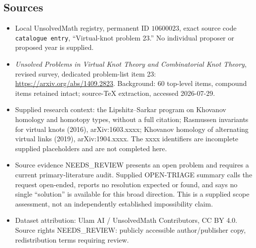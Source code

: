\documentclass[11pt]{article}
\begin{document}
\subsection{Sources}
\begin{itemize}
\item Local UnsolvedMath registry, permanent ID \(10600023\), exact source code \texttt{catalogue entry}, ``Virtual-knot problem 23.'' No individual proposer or proposed year is supplied.
\item \emph{Unsolved Problems in Virtual Knot Theory and Combinatorial Knot Theory}, revised survey, dedicated problem-list item 23: \url{https://arxiv.org/abs/1409.2823}. Background: 60 top-level items, compound items retained intact; source-TeX extraction, accessed 2026-07-29.
\item Supplied research context: the Lipshitz--Sarkar program on Khovanov homology and homotopy types, without a full citation; Rasmussen invariants for virtual knots (2016), arXiv:1603.xxxx; Khovanov homology of alternating virtual links (2019), arXiv:1904.xxxx. The xxxx identifiers are incomplete supplied placeholders and are not completed here.
\item Source evidence NEEDS\_REVIEW presents an open problem and requires a current primary-literature audit. Supplied OPEN-TRIAGE summary calls the request open-ended, reports no resolution expected or found, and says no single ``solution'' is available for this broad direction. This is a supplied scope assessment, not an independently established impossibility claim.
\item Dataset attribution: Ulam AI / UnsolvedMath Contributors, CC BY 4.0. Source rights NEEDS\_REVIEW: publicly accessible author/publisher copy, redistribution terms requiring review.
\end{itemize}
\end{document}

